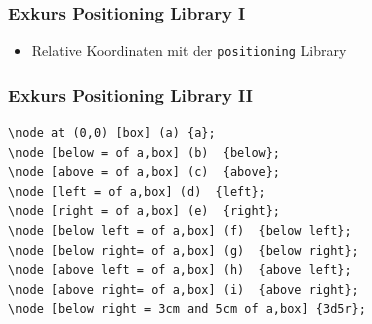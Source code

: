 \documentclass[14pt,ngerman]{beamer}
\begin{document}
\begin{frame}
\frametitle{Exkurs Positioning Library I}

\begin{itemize}
	\item Relative Koordinaten mit der \texttt{positioning} Library
\end{itemize}

\begin{center}
\end{center}

\end{frame}


\begin{frame}[containsverbatim]
\frametitle{Exkurs Positioning Library II}

\begin{lstlisting}
\node at (0,0) [box] (a) {a};
\node [below = of a,box] (b)  {below};
\node [above = of a,box] (c)  {above};
\node [left = of a,box] (d)  {left};
\node [right = of a,box] (e)  {right};
\node [below left = of a,box] (f)  {below left};
\node [below right= of a,box] (g)  {below right};
\node [above left = of a,box] (h)  {above left};
\node [above right= of a,box] (i)  {above right};
\node [below right = 3cm and 5cm of a,box] {3d5r};
\end{lstlisting}

\end{frame}
\end{document}
